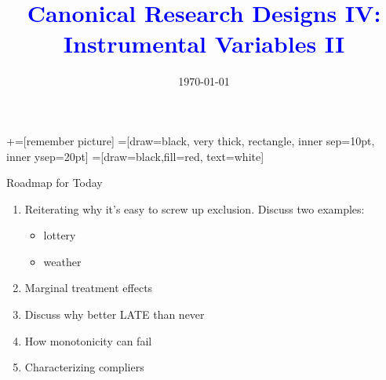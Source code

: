 \documentclass[notes,11pt, aspectratio=169]{beamer}
\title[]{\textcolor{blue}{Canonical Research Designs IV:\\ Instrumental Variables II }}
\author[PGP]{}
\institute[FRBNY]{\small{\begin{tabular}{c}
  Paul Goldsmith-Pinkham  \\
\end{tabular}}}
\date{\today}
\begin{document}
\newcommand\marktopleft[1]{%
    \tikz[overlay,remember picture] 
        \node (marker-#1-a) at (-.3em,.3em) {};%
}
\newcommand\markbottomright[2]{%
    \tikz[overlay,remember picture] 
        \node (marker-#1-b) at (0em,0em) {};%
}
+=[remember picture] 
 =[draw=black, very thick, rectangle, inner sep=10pt, inner ysep=20pt]
 =[draw=black,fill=red, text=white]

\begin{frame}
\maketitle
\end{frame}

\begin{frame}{Roadmap for Today}
    \begin{enumerate}
    \item Reiterating why it's easy to screw up exclusion. Discuss two examples:
      \begin{itemize}
      \item lottery
      \item weather
      \end{itemize}
    \item Marginal treatment effects
    \item Discuss why better LATE than never      
    \item How monotonicity can fail
    \item Characterizing compliers
    \end{enumerate}

\end{frame}

\end{document}
